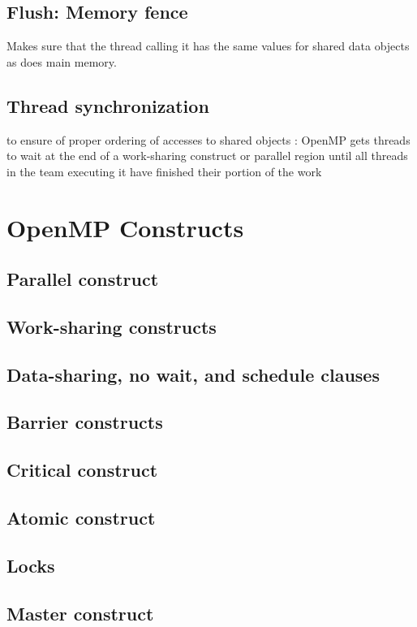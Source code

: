 \documentclass{myproc}
\begin{document}
\subsection{Flush: Memory fence}
\bit
\w Makes sure that the thread calling it has the same values for shared data
objects as does main memory.
\eit

\subsection{Thread synchronization}
\bit
\w to ensure of proper ordering of accesses to shared objects
\w {}: OpenMP gets threads to wait at the end of a
work-sharing construct or parallel region until all threads in the team
executing it have finished their portion of the work
\eit


\section{OpenMP Constructs}
\subsection{Parallel construct}
\subsection{Work-sharing constructs}
\subsection{Data-sharing, no wait, and schedule clauses}
\subsection{Barrier constructs}
\subsection{Critical construct}
\subsection{Atomic construct}
\subsection{Locks}
\subsection{Master construct}
\end{document}
